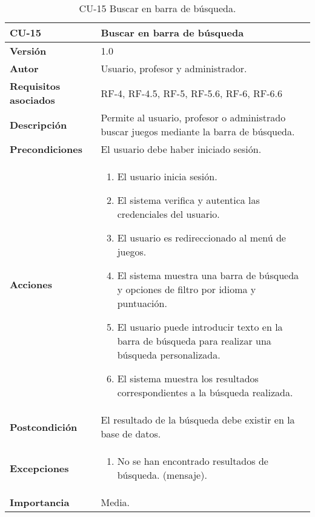 \begin{table}[h!]
	\centering
	\begin{tabularx}{\linewidth}{ p{} p{} }
		\toprule
		\textbf{CU-15}    & \textbf{Buscar en barra de búsqueda}\\
		\toprule
		\textbf{Versión}              & 1.0    \\
		\textbf{Autor}                & Usuario, profesor y administrador. \\
		\textbf{Requisitos asociados} & RF-4, RF-4.5, RF-5, RF-5.6, RF-6, RF-6.6 \\
		\textbf{Descripción}          & Permite al usuario, profesor o administrado buscar juegos mediante la barra de búsqueda.\\
		\textbf{Precondiciones}         & El usuario debe haber iniciado sesión. \\
		\textbf{Acciones}             &
		\begin{enumerate}
			\def\labelenumi{\arabic{enumi}.}
			\tightlist
			\item El usuario inicia sesión.
            \item El sistema verifica y autentica las credenciales del usuario.
            \item El usuario es redireccionado al menú de juegos.
            \item El sistema muestra una barra de búsqueda y opciones de filtro por idioma y puntuación.
            \item El usuario puede introducir texto en la barra de búsqueda para realizar una búsqueda personalizada.
            \item El sistema muestra los resultados correspondientes a la búsqueda realizada.
		\end{enumerate}\\
         \textbf{Postcondición}             & El resultado de la búsqueda debe existir en la base de datos. \\
		\textbf{Excepciones}             &
		\begin{enumerate}
			\def\labelenumi{\arabic{enumi}.}
			\tightlist
			\item No se han encontrado resultados de búsqueda. (mensaje).
		\end{enumerate}\\
		\textbf{Importancia}          & Media. \\
		\bottomrule
	\end{tabularx}
	\caption{CU-15 Buscar en barra de búsqueda.}
\end{table}

